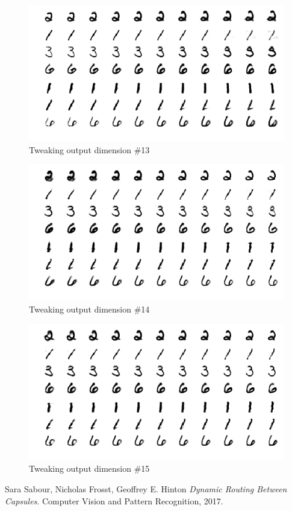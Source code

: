 \documentclass[10pt,twocolumn,letterpaper]{article}
\begin{document}
\begin{figure}[ht]
	\includegraphics[width=\columnwidth]{j13}
	\caption{Tweaking output dimension \#13}
\end{figure}
\begin{figure}[ht]
	\includegraphics[width=\columnwidth]{j14}
	\caption{Tweaking output dimension \#14}
\end{figure}
\begin{figure}[ht]
	\includegraphics[width=\columnwidth]{j15}
	\caption{Tweaking output dimension \#15}
\end{figure}

\vfill
\begin{thebibliography}{9}
	Sara Sabour, Nicholas Frosst, Geoffrey E. Hinton
	\textit{Dynamic Routing Between Capsules}. 
	Computer Vision and Pattern Recognition, 2017.
\end{thebibliography}
\end{document}

